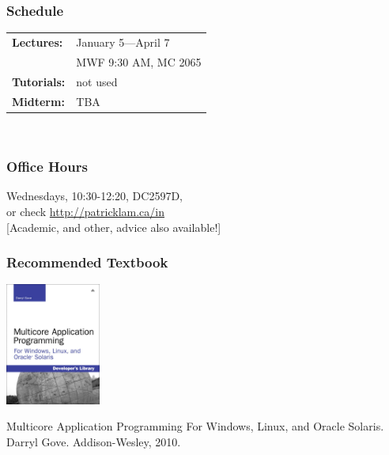 \documentclass[aspectratio=43]{beamer}
\newenvironment{changemargin}[1]{%
  \begin{list}{}{%
    \setlength{\topsep}{0pt}%
    \setlength{\leftmargin}{#1}%
    \setlength{\rightmargin}{1em}
    \setlength{\listparindent}{\parindent}%
    \setlength{\itemindent}{\parindent}%
    \setlength{\parsep}{\parskip}%
  }%
  \item[]}{\end{list}}
\begin{document}
\begin{frame}
  \frametitle{Schedule}

  \begin{changemargin}{2cm}
\begin{tabular}{ll}{\bf Lectures:} &
  January 5---April 7 \\ & MWF 9:30 AM, MC 2065\\
{\bf Tutorials:}& not used\\[1em]
{\bf Midterm:}& TBA
  \end{tabular}~\\[1em]
  \end{changemargin}
\end{frame}

\begin{frame}
  \frametitle{Office Hours}

  \begin{changemargin}{2cm}
    Wednesdays, 10:30-12:20, DC2597D,\\[1em]
    or check \url{http://patricklam.ca/in}\\[1em]
    [Academic, and other, advice also available!]
  \end{changemargin}
\end{frame}

\begin{frame}
  \frametitle{Recommended Textbook}

  \begin{center}
    \includegraphics[height=4cm]{L01/textbook.jpg}
  \end{center}

  Multicore Application Programming For Windows, Linux, and Oracle Solaris.
  Darryl Gove. Addison-Wesley, 2010.
\end{frame}
\end{document}
